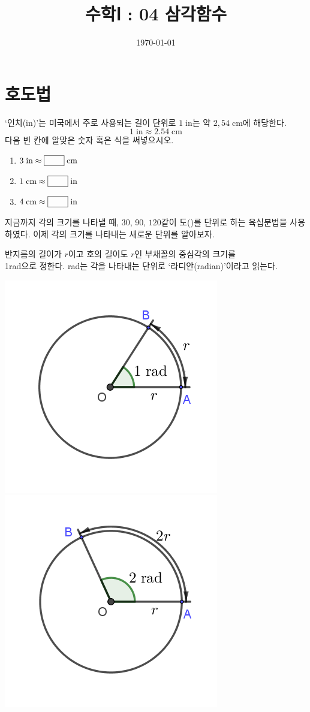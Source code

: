 \documentclass{oblivoir}
\begin{document}
\title{수학Ⅰ : 04 삼각함수}
\author{}
\date{\today}
\maketitle
\tableofcontents
\newpage

\section{호도법}

%
\label{rad1}
`인치(in)'는  미국에서 주로 사용되는 길이 단위로 \(1\;\text{in}\)는 약 \(2,54\;\text{cm}\)에 해당한다.
\[1\;\text{in}\approx2.54\;\text{cm}\]
다음 빈 칸에 알맞은 숫자 혹은 식을 써넣으시오.
\begin{enumerate}
\item
\(3\;\text{in}\approx\pb{8.62}\;\text{cm}\)
\item
\(1\;\text{cm}\approx\pb{0.39}\;\text{in}\)
\item
\(4\;\text{cm}\approx\pb{0.91}\;\text{in}\)
\end{enumerate}

\bigskip\bigskip
지금까지 각의 크기를 나타낼 때, 30\degree, 90\degree, \(120\) 같이 도(\degree)를 단위로 하는 육십분법을 사용하였다.
이제 각의 크기를 나타내는 새로운 단위를 알아보자.
\begin{mdframed}
%
\label{rad2}
반지름의 길이가 \(r\)이고 호의 길이도 \(r\)인 부채꼴의 중심각의 크기를\\ 1rad으로 정한다.
rad는 각을 나타내는 단위로 `라디안(radian)'이라고 읽는다.
\begin{center}
\includegraphics[width=.3\textwidth]{rad_2-1}
\qquad\qquad
\includegraphics[width=.3\textwidth]{rad_2-2}
\end{center}
\end{mdframed}
\end{document}

